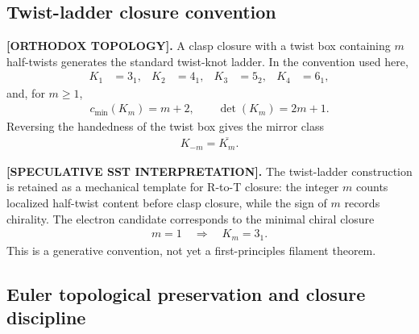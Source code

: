 
\subsection{Twist-ladder closure convention}
    \label{subsec:twist_ladder_closure_convention}

    \textbf{[ORTHODOX TOPOLOGY].}
    A clasp closure with a twist box containing \(m\) half-twists generates the
    standard twist-knot ladder. In the convention used here,
    \begin{align}
        K_1 &= 3_1, &
        K_2 &= 4_1, &
        K_3 &= 5_2, &
        K_4 &= 6_1,
    \end{align}
    and, for \(m\geq 1\),
    \begin{align}
        c_{\min}(K_m)=m+2,
        \qquad
        \det(K_m)=2m+1 .
        \label{eq:twist_knot_ladder_invariants}
    \end{align}
    Reversing the handedness of the twist box gives the mirror class
    \begin{align}
        K_{-m}=\overline{K_m} .
    \end{align}

    \textbf{[SPECULATIVE SST INTERPRETATION].}
    The twist-ladder construction is retained as a mechanical template for
    R-to-T closure: the integer \(m\) counts localized half-twist content before
    clasp closure, while the sign of \(m\) records chirality. The electron
    candidate corresponds to the minimal chiral closure
    \begin{align}
        m=1 \quad\Longrightarrow\quad K_m=3_1 .
    \end{align}
    This is a generative convention, not yet a first-principles filament theorem.

\subsection{Euler topological preservation and closure discipline}
    \label{subsec:euler_topological_preservation_closure}

